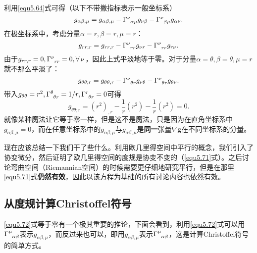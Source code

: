 利用\eqref{equ5.64}式可得（以下不带撇指标表示一般坐标系）
\begin{equation}
    g_{\alpha \beta; \mu} = g_{\alpha \beta, \mu} - \Gamma\indices{^\nu_{\alpha \mu}} g_{\nu \beta} - \Gamma\indices{^\nu_{\beta \mu}} g_{\alpha \nu}.
\label{equ5.72}
\end{equation}
在极坐标系中，考虑分量$\alpha = r, \beta = r, \mu = r$：
\[
    g_{rr; r} = g_{rr, r} - \Gamma\indices{^\nu_{rr}} g_{\nu r} - \Gamma\indices{^\nu_{rr}} g_{r \nu}.
\]
由于$g_{rr, r} = 0, \Gamma\indices{^\nu_{rr}} = 0, \forall\, \nu$，因此上式平淡地等于零。对于分量$\alpha = \theta, \beta = \theta, \mu = r$就不那么平淡了：
\[
    g_{\theta \theta; r} = g_{\theta \theta, r} - \Gamma\indices{^\nu_{\theta r}} g_{\nu \theta} - \Gamma\indices{^\nu_{\theta r}} g_{\theta \nu}.
\]
带入$g_{\theta \theta} = r^2, \Gamma\indices{^\theta_{\theta r}} = 1/r, \Gamma\indices{^r_{\theta r}} = 0$可得
\[
    g_{\theta \theta; r} = (r^2)_{, r} - \frac{1}{r} (r^2) - \frac{1}{r} (r^2) = 0.
\]
就像某种魔法让它等于零一样，但是这不是魔法，只是因为在直角坐标系中$g_{\alpha \beta, \mu} = 0$，而在任意坐标系中的$g_{\alpha \beta; \mu}$与$g_{\alpha \beta, \mu}$是\textbf{同一}张量$\nabla \bm{g}$在不同坐标系的分量。

现在应该总结一下我们干了些什么。利用欧几里得空间中平行的概念，我们引入了协变微分，然后证明了欧几里得空间的度规是协变不变的（\eqref{equ5.71}式）。之后讨论弯曲空间（Riemannian空间）的时候需要更仔细地研究平行，但是在那里\eqref{equ5.71}式\textbf{仍然有效}，因此以该方程为基础的所有讨论内容也依然有效。

\subsection*{从度规计算Christoffel符号}
\eqref{equ5.72}式等于零有一个极其重要的推论，下面会看到，利用\eqref{equ5.72}式可以用$\Gamma\indices{^\mu_{\alpha \beta}}$表示$g_{\alpha \beta, \mu}$，而反过来也可以，即用$g_{\alpha \beta, \mu}$表示$\Gamma\indices{^\mu_{\alpha \beta}}$，这是计算Christoffel符号的简单方式。

